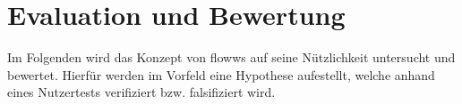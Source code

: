 \chapter{Evaluation und Bewertung}
Im Folgenden wird das Konzept von flowws auf seine Nützlichkeit untersucht und bewertet. Hierfür werden im Vorfeld eine Hypothese aufestellt, welche anhand eines Nutzertests verifiziert bzw. falsifiziert wird.








